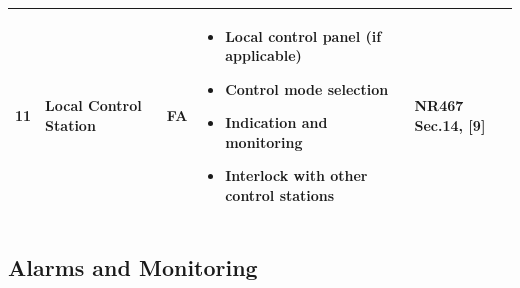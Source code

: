 \documentclass[11pt,a4paper]{report}
\newcommand{\fa}{\textbf{\textcolor{warningred}{FA}}}
\begin{document}
\begin{longtable}{|p{0.5cm}|p{5cm}|p{1.5cm}|p{5.5cm}|p{2cm}|}
11 & Local Control Station & \fa{} & 
\begin{itemize}[leftmargin=*,nosep]
\item Local control panel (if applicable)
\item Control mode selection
\item Indication and monitoring
\item Interlock with other control stations
\end{itemize} & NR467 Sec.14, [9] \\
\hline

\end{longtable}

\subsection{Alarms and Monitoring}
\end{document}
